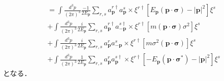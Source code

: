 \begin{align}
  & = \int \frac{d^3p}{(2\pi)^3} \frac{-1}{2E_{\boldsymbol{p}}} \sum_{r, s} a_{\boldsymbol{p}}^{r\dagger} a_{\boldsymbol{p}}^s
  \times \xi^{r\dagger} \left [E_{\boldsymbol{p}} (\boldsymbol{p} \cdot \boldsymbol{\sigma}) - \lvert \boldsymbol{p} \rvert^2 \right ] \xi^s \label{prob3_4_H_1_1} \\
  & + \int \frac{d^3p}{(2\pi)^3} \frac{i}{2E_{\boldsymbol{p}}} \sum_{r, s} a_{\boldsymbol{p}}^{r\dagger} a_{-\boldsymbol{p}}^{s\dagger}
  \times \xi^{r\dagger} \left[ m (\boldsymbol{p} \cdot \boldsymbol{\sigma}) \sigma^2 \right] \xi^s \label{prob3_4_H_1_2} \\
  & + \int \frac{d^3p}{(2\pi)^3} \frac{i}{2E_{\boldsymbol{p}}} \sum_{r, s} a_{\boldsymbol{p}}^{r} a_{-\boldsymbol{p}}^s
  \times \xi^{r\dagger} \left [ m \sigma^2 (\boldsymbol{p} \cdot \boldsymbol{\sigma}) \right ] \xi^s \label{prob3_4_H_1_3} \\
  & + \int \frac{d^3p}{(2\pi)^3} \frac{1}{2E_{\boldsymbol{p}}} \sum_{r, s} a_{\boldsymbol{p}}^{r} a_{\boldsymbol{p}}^{s\dagger}
  \times \xi^{r\dagger} \left [ - E_{\boldsymbol{p}} (\boldsymbol{p} \cdot \boldsymbol{\sigma}^\ast) - \lvert \boldsymbol{p} \rvert^2 \right ] \xi^s \label{prob3_4_H_1_4}
\end{align}
となる．

